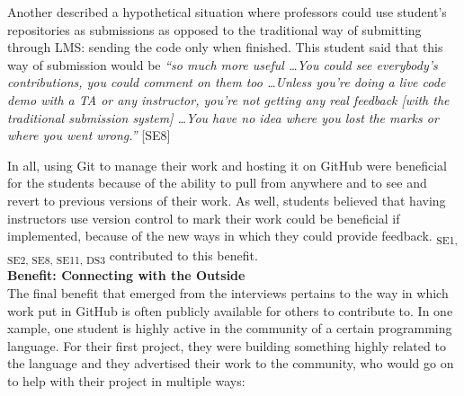 Another described a hypothetical situation where professors could use student's repositories as submissions as opposed to the traditional way of submitting through LMS: sending the code only when finished. This student said that this way of submission would be \textit{``so much more useful \ldots You could see everybody's contributions, you could comment on them too \ldots Unless you're doing a live code demo with a TA or any instructor, you're not getting any real feedback [with the traditional submission system] \ldots You have no idea where you lost the marks or where you went wrong.''} [SE8]

In all, using Git to manage their work and hosting it on GitHub were beneficial for the students because of the ability to pull from anywhere and to see and revert to previous versions of their work. As well, students believed that having instructors use version control to mark their work could be beneficial if implemented, because of the new ways in which they could provide feedback. \textsubscript{SE1, SE2, SE8, SE11, DS3} contributed to this benefit. \\




\textbf{Benefit: Connecting with the Outside} \\
The final benefit that emerged from the interviews pertains to the way in which work put in GitHub is often publicly available for others to contribute to. In one xample, one student is highly active in the community of a certain programming language. For their first project, they were building something highly related to the language and they advertised their work to the community, who would go on to help with their project in multiple ways:

